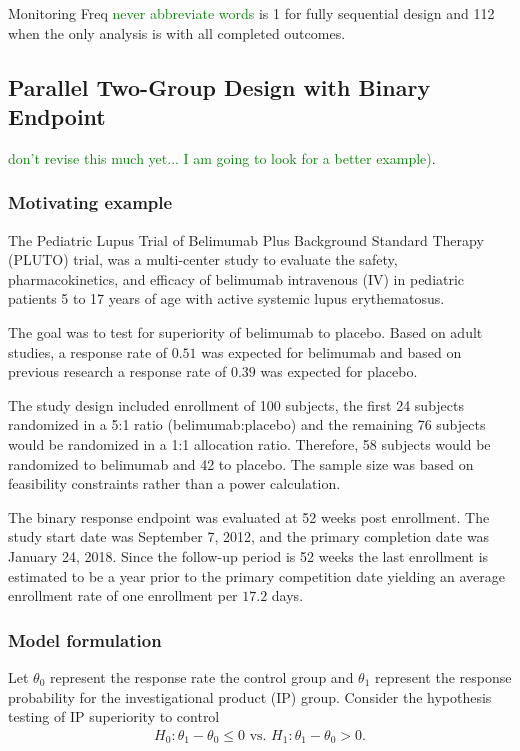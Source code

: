 \documentclass[12pt]{article}
\begin{document}
Monitoring Freq \textcolor{green}{never abbreviate words} is 1 for fully sequential design and 112 when the only analysis is with all completed outcomes.
\subsection{Parallel Two-Group Design with Binary Endpoint}
\textcolor{green}{don't revise this much yet... I am going to look for a better example)}.
\subsubsection{Motivating example}
The Pediatric Lupus Trial of Belimumab Plus Background Standard Therapy (PLUTO) trial, was a multi-center study to evaluate the safety, pharmacokinetics, and efficacy of belimumab intravenous (IV) in pediatric patients 5 to 17 years of age with active systemic lupus erythematosus. 

The goal was to test for superiority of belimumab to placebo. Based on adult studies, a response rate of $0.51$ was expected for belimumab and based on previous research a response rate of $0.39$ was expected for placebo.

The study design included enrollment of 100 subjects, the first 24 subjects randomized in a 5:1 ratio (belimumab:placebo) and the remaining 76 subjects would be randomized in a 1:1 allocation ratio. Therefore, 58 subjects would be randomized to belimumab and 42 to placebo. The sample size was based on feasibility constraints rather than a power calculation.

The binary response endpoint was evaluated at 52 weeks post enrollment. The study start date was September 7, 2012, and the primary completion date was January 24, 2018. Since the follow-up period is 52 weeks the last enrollment is estimated to be a year prior to the primary competition date yielding an average enrollment rate of one enrollment per $17.2$ days.
\subsubsection{Model formulation}
Let $\theta_0$ represent the response rate the control group and $\theta_1$ represent the response probability for the investigational product (IP) group. 
Consider the hypothesis testing of IP superiority to control
\begin{align*}
H_0:\theta_1-\theta_0\leq 0\text{ vs. }H_1: \theta_1-\theta_0>0.
\end{align*}
\end{document}
